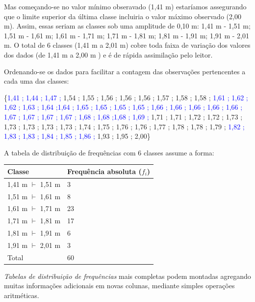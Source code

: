 \documentclass[
]{book}
\begin{document}
Mas começando-se no valor mínimo obseravado (1,41 m) estaríamos assegurando que o limite superior da última classe incluiria o valor máximo observado (2,00 m). Assim, essas seriam as classes sob uma amplitude de 0,10 m: 1,41 m - 1,51 m; 1,51 m - 1,61 m; 1,61 m - 1,71 m; 1,71 m - 1,81 m; 1,81 m - 1,91 m; 1,91 m - 2,01 m. O total de 6 classes (1,41 m a 2,01 m) cobre toda faixa de variação dos valores dos dados (de 1,41 m a 2,00 m ) e é de rápida assimilação pelo leitor.

\hfill\break

Ordenando-se os dados para facilitar a contagem das observações pertencentes a cada uma das classes:

\hfill\break

\{\textcolor{blue}{1,41 ; 1,44 ; 1,47 ;} 1,54 ; 1,55 ; 1,56 ; 1,56 ; 1,56 ; 1,57 ; 1,58 ; 1,58 ; \textcolor{blue}{1,61 ; 1,62 ; 1,62 ; 1,63 ; 1,64 ;1,64 ; 1,65 ; 1,65 ; 1,65 ; 1,65 ; 1,66 ; 1,66 ; 1,66 ; 1,66 ; 1,66 ; 1,67 ; 1,67 ; 1,67 ; 1,67 ; 1,68 ; 1,68 ;1,68 ; 1,69 ;} 1,71 ; 1,71 ; 1,72 ; 1,72 ; 1,73 ; 1,73 ; 1,73 ; 1,73 ; 1,73 ; 1,74 ; 1,75 ; 1,76 ; 1,76 ; 1,77 ; 1,78 ; 1,78 ; 1,79 ; \textcolor{blue}{1,82 ; 1,83 ; 1,83 ; 1,84 ; 1,85 ; 1,86 ;} 1,93 ; 1,95 ; 2,00\}

\hfill\break

A tabela de distribuição de frequências com 6 classes assume a forma:

\hfill\break

\begin{longtable}[]{@{}ll@{}}
\toprule()
Classe & Frequência absoluta (\(f_{i}\)) \\
\midrule()
\endhead
1,41 m \(\vdash\) 1,51 m & 3 \\
1,51 m \(\vdash\) 1,61 m & 8 \\
1,61 m \(\vdash\) 1,71 m & 23 \\
1,71 m \(\vdash\) 1,81 m & 17 \\
1,81 m \(\vdash\) 1,91 m & 6 \\
1,91 m \(\vdash\) 2,01 m & 3 \\
Total & 60 \\
\bottomrule()
\end{longtable}

\hfill\break

\emph{Tabelas de distribuição de frequências} mais completas podem montadas agregando muitas informações adicionais em novas colunas, mediante simples operações aritméticas.

\hfill\break
\end{document}
